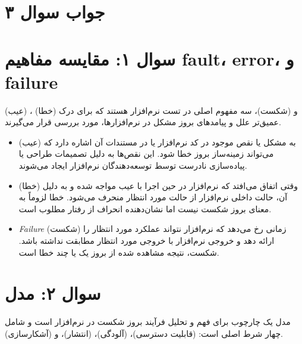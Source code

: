 \section*{جواب سوال ۳}

\section*{سوال ۱: مقایسه مفاهیم fault، error، و failure}

 (عیب)
،
 (خطا)
و
(شکست)، سه مفهوم اصلی در تست نرم‌افزار هستند که برای درک عمیق‌تر علل و پیامدهای بروز مشکل در نرم‌افزارها، مورد بررسی قرار می‌گیرند.

\begin{itemize}
	\item {} (عیب) به مشکل یا نقص موجود در کد نرم‌افزار یا در مستندات آن اشاره دارد که می‌تواند زمینه‌ساز بروز خطا شود. این نقص‌ها به دلیل تصمیمات طراحی یا پیاده‌سازی نادرست توسط توسعه‌دهندگان نرم‌افزار ایجاد می‌شوند.
	
	\item {} (خطا) وقتی اتفاق می‌افتد که نرم‌افزار در حین اجرا با عیب 
	مواجه شده و به دلیل آن، حالت داخلی نرم‌افزار از حالت مورد انتظار منحرف می‌شود. خطا لزوماً به معنای بروز شکست نیست اما نشان‌دهنده انحراف از رفتار مطلوب است.
	
	\item \textit{Failure} 
(شکست) زمانی رخ می‌دهد که نرم‌افزار نتواند عملکرد مورد انتظار را ارائه دهد و خروجی نرم‌افزار با خروجی مورد انتظار مطابقت نداشته باشد. شکست، نتیجه مشاهده شده از بروز یک یا چند خطا است.
\end{itemize}

\section*{سوال ۲: مدل }

مدل  یک چارچوب برای فهم و تحلیل فرآیند بروز شکست در نرم‌افزار است و شامل چهار شرط اصلی است:  (قابلیت دسترسی)،  (آلودگی)،  (انتشار)، و  (آشکارسازی).

